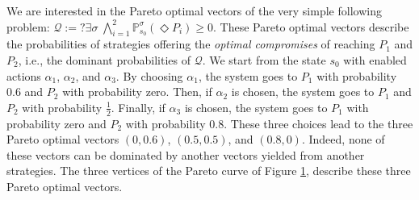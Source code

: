 \begin{example}
\begin{figure}[h]
    \label{pareto-curve-example}
  \end{figure}
We are interested in the Pareto optimal vectors of the very simple following \MOSR{} problem:
$\mathcal{Q}:= ?\exists \sigma \; \bigwedge_{i=1}^2 \mathbb{P}^\sigma_{s_0}(\Diamond P_i) \geq 0$.
These Pareto optimal vectors describe the probabilities of strategies offering the \textit{optimal compromises} of reaching $P_1$ and $P_2$, i.e., the dominant probabilities of $\mathcal{Q}$.
We start from the state $s_0$ with enabled actions $\alpha_1$, $\alpha_2$, and $\alpha_3$.
By choosing $\alpha_1$, the system goes to $P_1$ with probability $0.6$ and $P_2$ with probability zero.
Then, if $\alpha_2$ is chosen, the system goes to $P_1$ and $P_2$ with probability $\frac{1}{2}$.
Finally, if $\alpha_3$ is chosen, the system goes to $P_1$ with probability zero and $P_2$ with probability $0.8$.
These three choices lead to the three Pareto optimal  vectors
$(0, 0.6)$, $(0.5, 0.5)$, and $(0.8, 0)$.
Indeed, none of these vectors can be dominated by
another vectors yielded from another strategies.
The three vertices of the Pareto curve of Figure \ref{pareto-curve-example}, describe these three Pareto optimal vectors.
\end{example}


